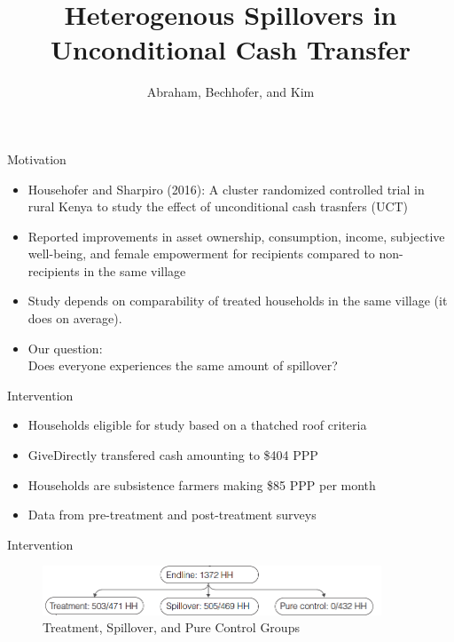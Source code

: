 \documentclass[14pt, aspectratio=169]{beamer}
\title[Heteregenous Spillovers in Unconditional Cash Transfer] %
{Heterogenous Spillovers in Unconditional Cash Transfer}
\author[Abraham, Bechhofer, and Kim] %
{Abraham, Bechhofer, and Kim }
\begin{document}
\begin{frame}
  \titlepage
\end{frame}

\begin{frame}{Motivation}
\begin{itemize}
	\item Househofer and Sharpiro (2016): A cluster randomized controlled trial in rural Kenya to study the effect of unconditional cash trasnfers (UCT)
    \item Reported improvements in asset ownership, consumption, income, subjective well-being, and female empowerment for recipients compared to non-recipients in the same village
    \item Study depends on comparability of treated households in the same village (it does on average).
	\item Our question: \\ Does everyone experiences the same amount of spillover?
\end{itemize}
\end{frame}

\begin{frame}{Intervention}
    \begin{itemize}
    	\item Households eligible for study based on a thatched roof criteria
        \item GiveDirectly transfered cash amounting to \$404 PPP
        \item Households are subsistence farmers making \$85 PPP per month
        \item Data from pre-treatment and post-treatment surveys
    \end{itemize}
\end{frame}

\begin{frame}{Intervention}
\begin{figure}[H]
	\centering
	\includegraphics[width=0.9\textwidth]{groups.png}
	\caption{Treatment, Spillover, and Pure Control Groups}
\end{figure}
\end{frame}
\end{document}
